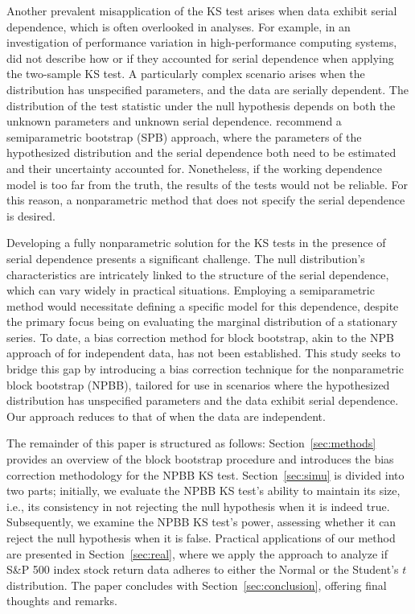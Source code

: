 \documentclass[12pt]{article}
\begin{document}
Another prevalent misapplication of the KS test arises when data exhibit serial
dependence, which is often overlooked in analyses. For example, in an
investigation of performance variation in high-performance computing systems,
\citet{tuncer2019ieee} did not describe how or if they accounted for serial
dependence when applying the two-sample KS test.
A particularly complex scenario arises when the distribution has unspecified
parameters, and the data are serially dependent.
The distribution of the test statistic under the null hypothesis depends on both
the unknown parameters and unknown serial dependence.
\citet{zeimbekakis2024misuses} recommend a semiparametric bootstrap (SPB)
approach, where the parameters of the hypothesized distribution and the serial
dependence both need to be estimated and their uncertainty accounted for.
Nonetheless, if the working dependence model is too far from the truth, the
results of the tests would not be reliable. For this reason, a nonparametric
method that does not specify the serial dependence is desired.


Developing a fully nonparametric solution for the KS
tests in the presence of serial dependence presents a significant
challenge. The null distribution's characteristics are intricately linked to
the structure of the serial dependence, which can vary widely in practical
situations. Employing a semiparametric method
\citep{zeimbekakis2024misuses} would necessitate defining a
specific model for this dependence, despite the primary focus being on
evaluating the marginal distribution of a stationary series. To date, a bias
correction method for block bootstrap, akin to the NPB
approach of \citet{babu2004goodness} for independent data,
has not been established. This study seeks
to bridge this gap by introducing a bias correction technique for the
nonparametric block bootstrap (NPBB), tailored for use in scenarios where the
hypothesized distribution has unspecified parameters and the data
exhibit serial dependence. Our approach reduces to that of
\citet{babu2004goodness} when the data are independent.


The remainder of this paper is structured as follows:
Section~\ref{sec:methods} provides an overview of the block bootstrap
procedure and introduces the bias correction methodology for the
NPBB KS test. Section~\ref{sec:simu} is divided
into two parts; initially, we evaluate the NPBB KS test's ability to maintain
its size, i.e., its consistency in not rejecting the null hypothesis when
it is indeed true. Subsequently, we examine the NPBB KS test's power, assessing
whether it can reject the null hypothesis when it is false. Practical
applications of our method are presented in Section~\ref{sec:real}, where
we apply the approach to analyze if S\&P 500 index stock return
data adheres to either the Normal or the Student's $t$ distribution. The
paper concludes with Section~\ref{sec:conclusion}, offering final thoughts
and remarks.
\end{document}
